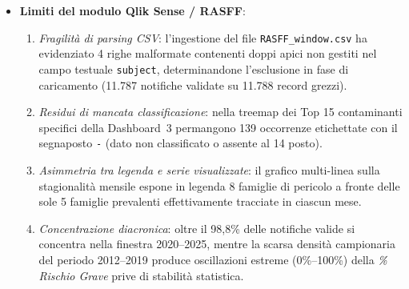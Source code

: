 \begin{itemize}
    \item \textbf{Limiti del modulo Qlik Sense / RASFF}:
    \begin{enumerate}
        \item \textit{Fragilità di parsing CSV}: l'ingestione del file \texttt{RASFF\_window.csv} ha evidenziato 4 righe malformate contenenti doppi apici non gestiti nel campo testuale \texttt{subject}, determinandone l'esclusione in fase di caricamento (11.787 notifiche validate su 11.788 record grezzi).
        \item \textit{Residui di mancata classificazione}: nella treemap dei Top 15 contaminanti specifici della Dashboard~3 permangono 139 occorrenze etichettate con il segnaposto \texttt{-} (dato non classificato o assente al 14\textdegree{} posto).
        \item \textit{Asimmetria tra legenda e serie visualizzate}: il grafico multi-linea sulla stagionalità mensile espone in legenda 8 famiglie di pericolo a fronte delle sole 5 famiglie prevalenti effettivamente tracciate in ciascun mese.
        \item \textit{Concentrazione diacronica}: oltre il 98,8\% delle notifiche valide si concentra nella finestra 2020--2025, mentre la scarsa densità campionaria del periodo 2012--2019 produce oscillazioni estreme (0\%--100\%) della \textit{\% Rischio Grave} prive di stabilità statistica.
    \end{enumerate}


\end{itemize}
